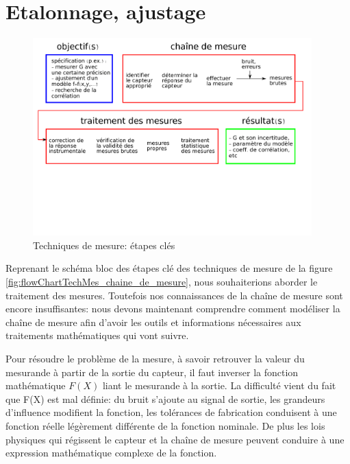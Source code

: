 \documentclass[main.tex]{subfiles}
\begin{document}
\iftrue


\chapter{Etalonnage, ajustage}
\label{chap:measurement-chain-modelisation}

\begin{figure}[h]
   \centering
   \includegraphics[width=0.96\textwidth]{assets/figures/flowChartTechMes.pdf} 
   \caption{Techniques de mesure: étapes clés}
\end{figure}

Reprenant le schéma bloc des étapes clé des techniques de mesure de la figure \ref{fig:flowChartTechMes_chaine_de_mesure}, nous souhaiterions aborder le traitement des mesures. Toutefois nos connaissances de la chaîne de mesure sont encore insuffisantes: nous devons maintenant comprendre comment modéliser la chaîne de mesure afin d'avoir les outils et informations nécessaires aux traitements mathématiques qui vont suivre.

Pour résoudre le problème de la mesure, à savoir retrouver la valeur du mesurande à partir de la sortie du capteur, il faut inverser la fonction mathématique $F(X)$ liant le mesurande à la sortie. La difficulté vient du fait que F(X) est mal définie: du bruit s'ajoute au signal de sortie, les grandeurs d'influence modifient la fonction, les tolérances de fabrication conduisent à une fonction réelle légèrement différente de la fonction nominale. De plus les lois physiques qui régissent le capteur et la chaîne de mesure peuvent conduire à une expression mathématique complexe de la fonction.
\end{document}
